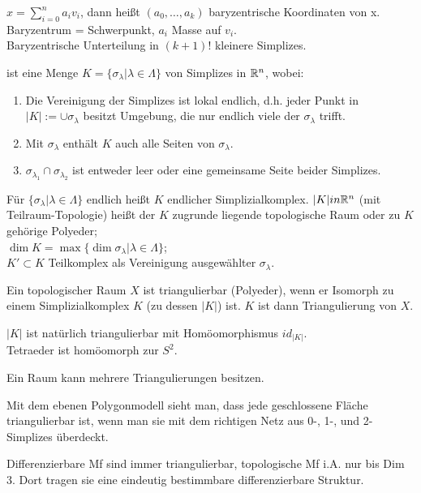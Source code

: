 \begin{bem}
	$x=\sum_{i=0}^n a_i v_i$, dann heißt $(a_0,\dots,a_k)$ baryzentrische Koordinaten von x. 
	Baryzentrum = Schwerpunkt, $a_i$ Masse auf $v_i$.\\
	Baryzentrische Unterteilung in $(k+1)!$ kleinere Simplizes.
\end{bem}

\begin{defi}[Simplizialkomplex]
	ist eine Menge $K = \{\sigma_\lambda | \lambda \in \Lambda\}$ von Simplizes in $\mathbb R^n$, wobei:
	\begin{enumerate}
		\item Die Vereinigung der Simplizes ist lokal endlich, d.h. jeder Punkt in 
		$|K| := \cup\sigma_\lambda$ besitzt Umgebung, die nur endlich viele der 
		$\sigma_\lambda$ trifft.
		\item Mit $\sigma_\lambda$ enthält $K$ auch alle Seiten von $\sigma_\lambda$.
		\item $\sigma_{\lambda_1} \cap \sigma_{\lambda_2}$ ist entweder leer oder 
		eine gemeinsame Seite beider Simplizes.
	\end{enumerate}
	Für $\{\sigma_\lambda | \lambda \in \Lambda\}$ endlich heißt $K$ endlicher Simplizialkomplex.
	$|K| in \mathbb R^n$ (mit Teilraum-Topologie) heißt der $K$ zugrunde liegende topologische Raum
	oder zu $K$ gehörige Polyeder;\\
	$\dim K = \max \{\dim\sigma_\lambda | \lambda \in \Lambda\}$;\\
	$K'\subset K$ Teilkomplex als Vereinigung ausgewählter $\sigma_\lambda$.
\end{defi}

\begin{defi}[Triangulierbar]
	Ein topologischer Raum $X$ ist triangulierbar (Polyeder), wenn er Isomorph zu 
	einem Simplizialkomplex $K$ (zu dessen $|K|$) ist. 
	$K$ ist dann Triangulierung von $X$.
\end{defi}

\begin{bsp}
	$|K|$ ist natürlich triangulierbar mit Homöomorphismus $id_{|K|}$.\\
	Tetraeder ist homöomorph zur $S^2$.
\end{bsp}

\begin{bem}
	Ein Raum kann mehrere Triangulierungen besitzen.
\end{bem}

\begin{bem}
	Mit dem ebenen Polygonmodell sieht man, dass jede geschlossene Fläche triangulierbar ist,
	wenn man sie mit dem richtigen Netz aus 0-, 1-, und 2-Simplizes überdeckt.
\end{bem}

\begin{bem}
	Differenzierbare Mf sind immer triangulierbar, topologische Mf i.A. nur bis Dim 3.
	Dort tragen sie eine eindeutig bestimmbare differenzierbare Struktur.
\end{bem}

